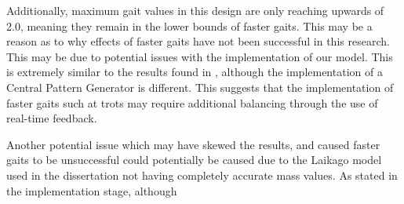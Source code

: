 


Additionally, maximum gait values in this design are only reaching upwards of 2.0, meaning they remain in the lower bounds of faster gaits. This may be a reason as to why effects of faster gaits have not been successful in this research. This may be due to potential issues with the implementation of our model. This is extremely similar to the results found in \cite{Rutishauser2008}, although the implementation of a Central Pattern Generator is different. This suggests that the implementation of faster gaits such at trots may require additional balancing through the use of real-time feedback. 

Another potential issue which may have skewed the results, and caused faster gaits to be unsuccessful could potentially be caused due to the Laikago model used in the dissertation not having completely accurate mass values. As stated in the implementation stage, although 







